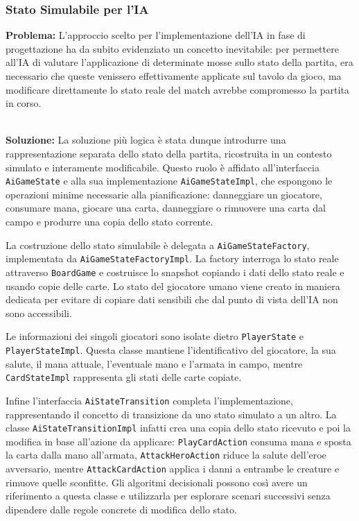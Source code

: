 \subsubsection{Stato Simulabile per l'IA}

\textbf{Problema:} L'approccio scelto per l'implementazione dell'IA in fase di
progettazione ha da subito evidenziato un concetto inevitabile: per permettere
all'IA di valutare l'applicazione di determinate mosse sullo stato della
partita, era necessario che queste venissero effettivamente applicate sul tavolo
da gioco, ma modificare direttamente lo stato reale del match avrebbe compromesso
la partita in corso.

\textbf{\\Soluzione:} La soluzione più logica è stata dunque introdurre una
rappresentazione separata dello stato della partita, ricostruita in un contesto
simulato e interamente modificabile. Questo ruolo è affidato all'interfaccia
\texttt{AiGameState} e alla sua implementazione \texttt{AiGameStateImpl}, che
espongono le operazioni minime necessarie alla pianificazione: danneggiare un
giocatore, consumare mana, giocare una carta, danneggiare o rimuovere una carta
dal campo e produrre una copia dello stato corrente.

La costruzione dello stato simulabile è delegata a
\texttt{AiGameStateFactory}, implementata da \texttt{AiGameStateFactoryImpl}.
La factory interroga lo stato reale attraverso \texttt{BoardGame} e costruisce
lo snapshot copiando i dati dello stato reale e usando copie delle carte.
Lo stato del giocatore umano viene creato in maniera dedicata per evitare di
copiare dati sensibili che dal punto di vista dell'IA non sono accessibili.

Le informazioni dei singoli giocatori sono isolate dietro \texttt{PlayerState}
e \texttt{PlayerStateImpl}. Questa classe mantiene l'identificativo del
giocatore, la sua salute, il mana attuale, l'eventuale mano e l'armata in campo, mentre
\texttt{CardStateImpl} rappresenta gli stati delle carte copiate.

Infine l'interfaccia \texttt{AiStateTransition} completa l'implementazione, rappresentando
il concetto di transizione da uno stato simulato a un altro.
La classe \texttt{AiStateTransitionImpl} infatti crea una copia dello stato
ricevuto e poi la modifica in base all'azione da applicare:
\texttt{PlayCardAction} consuma mana e sposta la carta dalla mano all'armata,
\texttt{AttackHeroAction} riduce la salute dell'eroe avversario, mentre
\texttt{AttackCardAction} applica i danni a entrambe le creature e rimuove
quelle sconfitte.
Gli algoritmi decisionali possono così avere un riferimento a questa classe e utilizzarla
per esplorare scenari successivi senza dipendere dalle regole concrete di modifica dello stato.

